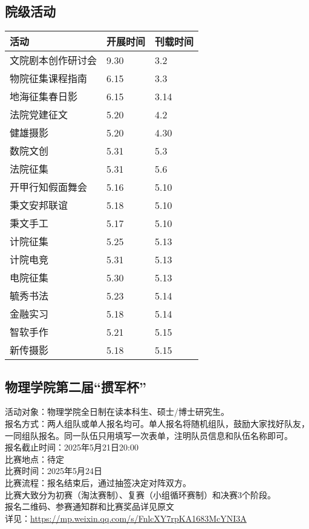\documentclass[letterpaper, 12pt]{article}
\begin{document}
\begin{multicols}{2}
\section{院级活动}
\begin{tabular}{|>{\centering\arraybackslash}m{}|m{}|m{}|}
\hline
    活动 & 开展时间 & 刊载时间\\
    \hline\hline
    文院剧本创作研讨会 & 9.30 & 3.2\\
    物院征集课程指南 & 6.15 & 3.3\\
    地海征集春日影 & 6.15 & 3.14\\
    法院党建征文 & 5.20 & 4.2\\
    健雄摄影 & 5.20 & 4.30\\
    数院文创 & 5.31 & 5.3\\
    法院征集 & 5.31 & 5.6\\
    开甲行知假面舞会 & 5.16 & 5.10\\
    秉文安邦联谊 & 5.18 & 5.10\\
    秉文手工 & 5.17 & 5.10\\
    计院征集 & 5.25 & 5.13\\
    计院电竞 & 5.31 & 5.13\\
    电院征集 & 5.30 & 5.13\\
    毓秀书法 & 5.23 & 5.14\\
    金融实习 & 5.18 & 5.14\\
    智软手作 & 5.21 & 5.15\\
    新传摄影 & 5.18 & 5.15\\
    
    \hline
\end{tabular}

\subsection{物理学院第二届“掼军杯”} %
活动对象：物理学院全日制在读本科生、硕士/博士研究生。
\\报名方式：两人组队或单人报名均可。单人报名将随机组队，鼓励大家找好队友，一同组队报名。同一队伍只用填写一次表单，注明队员信息和队伍名称即可。
\\报名截止时间：2025年5月21日20:00
\\比赛地点：待定
\\比赛时间：2025年5月24日
\\比赛流程：报名结束后，通过抽签决定对阵双方。
\\比赛大致分为初赛（淘汰赛制）、复赛（小组循环赛制）和决赛3个阶段。
\\报名二维码、参赛通知群和比赛奖品详见原文
\\详见：\url{https://mp.weixin.qq.com/s/FnlcXY7rpKA1683McYNI3A}


\end{multicols}
\end{document}
